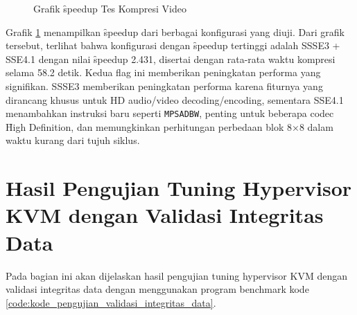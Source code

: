 \begin{figure}
    \centering
    \caption{Grafik \f{speedup} Tes Kompresi Video}
    \label{fig:video_compression_test_graph}
\end{figure}

Grafik \ref{fig:video_compression_test_graph} menampilkan \f{speedup} dari berbagai konfigurasi yang diuji. Dari grafik tersebut, terlihat bahwa konfigurasi dengan \f{speedup} tertinggi adalah SSSE3 + SSE4.1 dengan nilai \f{speedup} 2.431, disertai dengan rata-rata waktu kompresi selama 58.2 detik. Kedua flag ini memberikan peningkatan performa yang signifikan. SSSE3 memberikan peningkatan performa karena fiturnya yang dirancang khusus untuk HD audio/video decoding/encoding, sementara SSE4.1 menambahkan instruksi baru seperti \texttt{MPSADBW}, penting untuk beberapa codec \f{High Definition}, dan memungkinkan perhitungan perbedaan blok 8×8 dalam waktu kurang dari tujuh siklus.

\section{Hasil Pengujian Tuning Hypervisor KVM dengan Validasi Integritas Data}
Pada bagian ini akan dijelaskan hasil pengujian tuning hypervisor KVM dengan validasi integritas data dengan menggunakan program benchmark kode \ref{code:kode_pengujian_validasi_integritas_data}.

